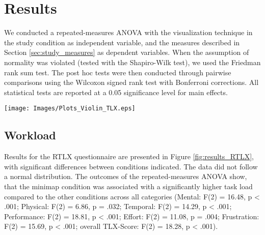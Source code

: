 \section{Results}
\label{section:results}
We conducted a repeated-measures ANOVA with the visualization technique in the study condition as independent variable, and the measures described in Section \ref{sec:study_measures} as dependent variables. When the assumption of normality was violated (tested with the Shapiro-Wilk test), we used the Friedman rank sum test. The post hoc tests were then conducted through pairwise comparisons using the Wilcoxon signed rank test with Bonferroni corrections. All statistical tests are reported at a 0.05 significance level for main effects. 


\begin{figure*}[t]
    \centering
    \texttt{[image: Images/Plots\_Violin\_TLX.eps]}
    \caption{The mean values for each RTLX subscale, split by condition. Scales range from 0 to 100, lower is better. Significant differences are marked with lines between plots.}
    \label{fig:results_RTLX}
\end{figure*}

\subsection{Workload}
Results for the RTLX questionnaire are presented in Figure \ref{fig:results_RTLX}, with significant differences between conditions indicated. The data did not follow a normal distribution. The outcomes of the repeated-measures ANOVA show, that the minimap condition was associated with a significantly higher task load compared to the other conditions across all categories (Mental: F(2) = 16.48, p < .001; 
Physical: F(2) = 6.86, p = .032;
Temporal: F(2) = 14.29, p < .001; 
Performance: F(2) = 18.81, p < .001; 
Effort: F(2) = 11.08, p = .004; 
Frustration: F(2) = 15.69, p < .001; 
overall TLX-Score: F(2) = 18.28, p < .001).



